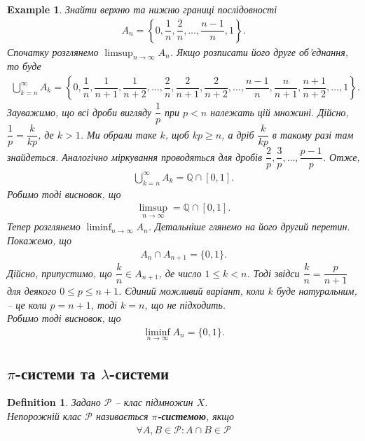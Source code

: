 \documentclass[a4paper, 10pt]{article}
\theoremstyle{theoremdd}
\newtheorem{definition}[theorem]{Definition}
\newtheorem{example}[theorem]{Example}
\begin{document}
\begin{example}
Знайти верхню та нижню границі послідовності
\begin{align*}
A_n = \left\{ 0, \dfrac{1}{n}, \dfrac{2}{n}, \dots, \dfrac{n-1}{n}, 1 \right\}.
\end{align*}
Спочатку розглянемо $\displaystyle\limsup_{n \to \infty} A_n$. Якщо розписати його друге об'єднання, то буде
\begin{align*}
\bigcup_{k=n}^\infty A_k = \left\{ 0,\dfrac{1}{n},\dfrac{1}{n+1},\dfrac{1}{n+2}, \dots, \dfrac{2}{n}, \dfrac{2}{n+1}, \dfrac{2}{n+2}, \dots, \dfrac{n-1}{n}, \dfrac{n}{n+1}, \dfrac{n+1}{n+2}, \dots, 1 \right\}.
\end{align*}
Зауважимо, що всі дроби вигляду $\dfrac{1}{p}$ при $p < n$ належать цій множині. Дійсно, $\dfrac{1}{p} = \dfrac{k}{kp}$, де $k > 1$. Ми обрали таке $k$, щоб $kp \geq n$, а дріб $\dfrac{k}{kp}$ в такому разі там знайдеться. Аналогічно міркування проводяться для дробів $\dfrac{2}{p}, \dfrac{3}{p},\dots,\dfrac{p-1}{p}$. Отже,
\begin{align*}
\bigcup_{k=n}^\infty A_k = \mathbb{Q} \cap [0,1].
\end{align*}
Робимо тоді висновок, що
\begin{align*}
\limsup_{n \to \infty} = \mathbb{Q} \cap [0,1].
\end{align*}
Тепер розглянемо $\displaystyle\liminf_{n \to \infty} A_n$. Детальніше глянемо на його другий перетин. Покажемо, що
\begin{align*}
A_n \cap A_{n+1} = \{0,1\}.
\end{align*}
Дійсно, припустимо, що $\dfrac{k}{n} \in A_{n+1}$, де число $1 \leq k < n$. Тоді звідси $\dfrac{k}{n} = \dfrac{p}{n+1}$ для деякого $0 \leq p \leq n+1$. Єдиний можливий варіант, коли $k$ буде натуральним, -- це коли $p = n+1$, тоді $k = n$, що не підходить.\\
Робимо тоді висновок, що
\begin{align*}
\liminf_{n \to \infty} A_n = \{0,1\}.
\end{align*}
\end{example}

\subsection{$\pi$-системи та $\lambda$-системи}
\begin{definition}
Задано $\mathcal{P}$ -- клас підмножин $X$.\\
Непорожній клас $\mathcal{P}$ називається \textbf{$\pi$-системою}, якщо
\begin{align*}
\forall A,B \in \mathcal{P}: A \cap B \in \mathcal{P}
\end{align*}
\end{definition}
\end{document}

